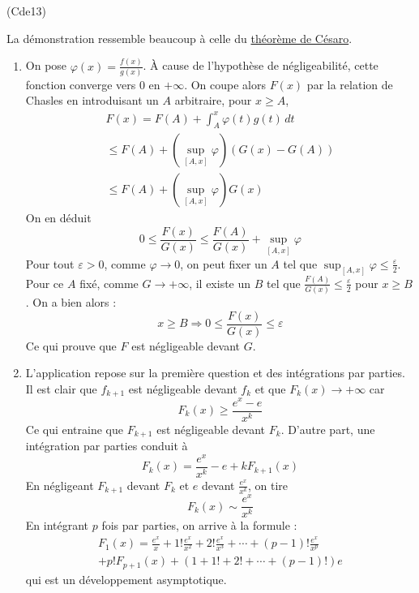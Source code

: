 \begin{tiny}(Cde13)\end{tiny} La démonstration ressemble beaucoup à celle du \href{http://back.maquisdoc.net/v-1/index.php?act=chelt&id_elt=4881}{théorème de Césaro}.
\begin{enumerate}
 \item On pose $\varphi(x)=\frac{f(x)}{g(x)}$. \`A cause de l'hypothèse de négligeabilité, cette fonction converge vers $0$ en $+\infty$. On coupe alors $F(x)$ par la relation de Chasles en introduisant un $A$ arbitraire, pour $x\geq A$,
\begin{multline*}
 F(x) = F(A)+\int_A^x\varphi(t)g(t)\,dt\\
\leq F(A) + (\sup_{[A,x]}\varphi) (G(x)-G(A))\\
\leq F(A) + (\sup_{[A,x]}\varphi) G(x)
\end{multline*}
On en déduit
\begin{displaymath}
 0\leq\frac{F(x)}{G(x)}\leq \frac{F(A)}{G(x)} + \sup_{[A,x]}\varphi 
\end{displaymath}
Pour tout $\varepsilon >0$, comme $\varphi \rightarrow 0$, on peut fixer un $A$ tel que $\sup_{[A,x]}\varphi\leq \frac{\varepsilon}{2}$. Pour ce $A$ fixé, comme $G\rightarrow +\infty$, il existe un $B$ tel que $\frac{F(A)}{G(x)}\leq \frac{\varepsilon}{2}$ pour $x\geq B$. On a bien alors :
\begin{displaymath}
 x\geq B \Rightarrow 0\leq\frac{F(x)}{G(x)}\leq \varepsilon
\end{displaymath}
Ce qui prouve que $F$ est négligeable devant $G$.
\item L'application repose sur la première question et des intégrations par parties.
Il est clair que $f_{k+1}$ est négligeable devant $f_k$ et que $F_k(x)\rightarrow +\infty$ car
\begin{displaymath}
 F_k(x) \geq \frac{e^x -e }{x^k}
\end{displaymath}
Ce qui entraine que $F_{k+1}$ est négligeable devant $F_k$. D'autre part, une intégration par parties conduit à 
\begin{displaymath}
 F_k(x) = \frac{e^x}{x^k} -e + kF_{k+1}(x)
\end{displaymath}
En négligeant $F_{k+1}$ devant $F_k$ et $e$ devant $\frac{e^x}{x^k}$, on tire
\begin{displaymath}
 F_k(x) \sim  \frac{e^x}{x^k}
\end{displaymath}
En intégrant $p$ fois par parties, on arrive à la formule :
\begin{multline*}
 F_1(x) = \frac{e^x}{x}+1!\frac{e^x}{x^2}+2!\frac{e^x}{x^3}+\cdots+(p-1)!\frac{e^x}{x^p}\\
+p!F_{p+1}(x)+\left( 1+1!+2!+\cdots+(p-1)!\right)e 
\end{multline*}
qui est un développement asymptotique.
\end{enumerate}
